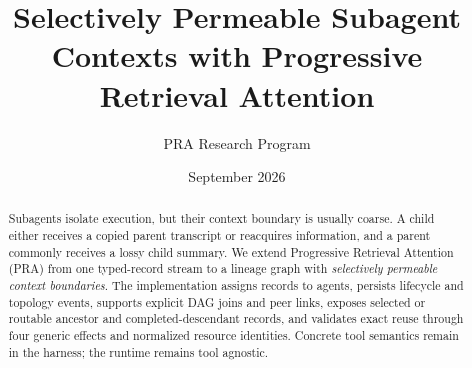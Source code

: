 \documentclass[11pt]{article}
\title{Selectively Permeable Subagent Contexts with Progressive Retrieval Attention}
\author{PRA Research Program}
\date{September 2026}
\begin{document}
\maketitle

\begin{abstract}
Subagents isolate execution, but their context boundary is usually coarse. A
child either receives a copied parent transcript or reacquires information, and
a parent commonly receives a lossy child summary. We extend Progressive
Retrieval Attention (PRA) from one typed-record stream to a lineage graph with
\emph{selectively permeable context boundaries}. The implementation assigns
records to agents, persists lifecycle and topology events, supports explicit
DAG joins and peer links, exposes selected or routable ancestor and
completed-descendant records, and validates exact reuse through four generic
effects and normalized resource identities. Concrete tool semantics remain in
the harness; the runtime remains tool agnostic.


\end{abstract}
\end{document}
